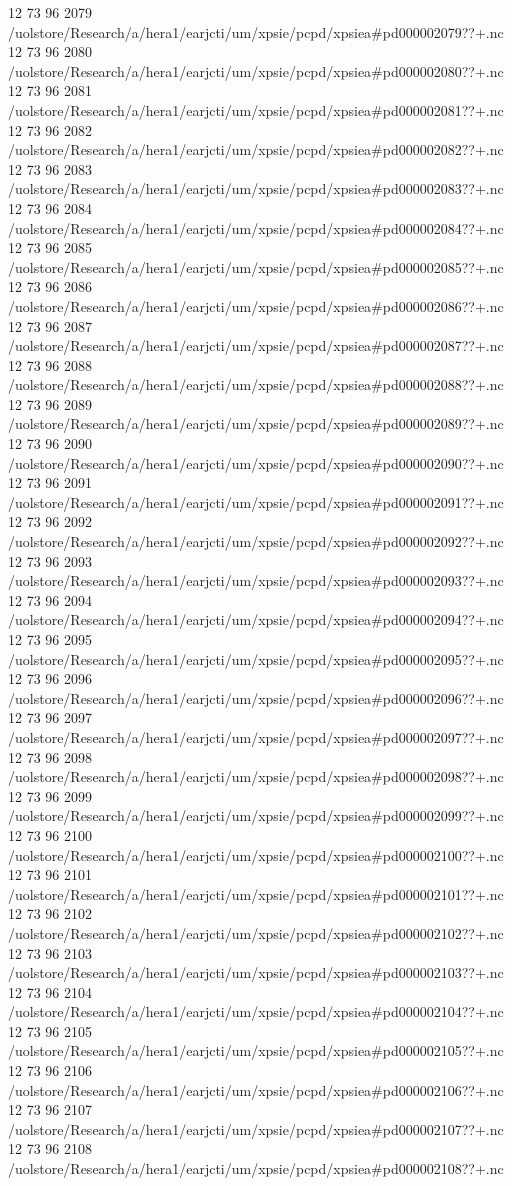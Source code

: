 12 73 96
2079
/uolstore/Research/a/hera1/earjcti/um/xpsie/pcpd/xpsiea#pd000002079??+.nc
12 73 96
2080
/uolstore/Research/a/hera1/earjcti/um/xpsie/pcpd/xpsiea#pd000002080??+.nc
12 73 96
2081
/uolstore/Research/a/hera1/earjcti/um/xpsie/pcpd/xpsiea#pd000002081??+.nc
12 73 96
2082
/uolstore/Research/a/hera1/earjcti/um/xpsie/pcpd/xpsiea#pd000002082??+.nc
12 73 96
2083
/uolstore/Research/a/hera1/earjcti/um/xpsie/pcpd/xpsiea#pd000002083??+.nc
12 73 96
2084
/uolstore/Research/a/hera1/earjcti/um/xpsie/pcpd/xpsiea#pd000002084??+.nc
12 73 96
2085
/uolstore/Research/a/hera1/earjcti/um/xpsie/pcpd/xpsiea#pd000002085??+.nc
12 73 96
2086
/uolstore/Research/a/hera1/earjcti/um/xpsie/pcpd/xpsiea#pd000002086??+.nc
12 73 96
2087
/uolstore/Research/a/hera1/earjcti/um/xpsie/pcpd/xpsiea#pd000002087??+.nc
12 73 96
2088
/uolstore/Research/a/hera1/earjcti/um/xpsie/pcpd/xpsiea#pd000002088??+.nc
12 73 96
2089
/uolstore/Research/a/hera1/earjcti/um/xpsie/pcpd/xpsiea#pd000002089??+.nc
12 73 96
2090
/uolstore/Research/a/hera1/earjcti/um/xpsie/pcpd/xpsiea#pd000002090??+.nc
12 73 96
2091
/uolstore/Research/a/hera1/earjcti/um/xpsie/pcpd/xpsiea#pd000002091??+.nc
12 73 96
2092
/uolstore/Research/a/hera1/earjcti/um/xpsie/pcpd/xpsiea#pd000002092??+.nc
12 73 96
2093
/uolstore/Research/a/hera1/earjcti/um/xpsie/pcpd/xpsiea#pd000002093??+.nc
12 73 96
2094
/uolstore/Research/a/hera1/earjcti/um/xpsie/pcpd/xpsiea#pd000002094??+.nc
12 73 96
2095
/uolstore/Research/a/hera1/earjcti/um/xpsie/pcpd/xpsiea#pd000002095??+.nc
12 73 96
2096
/uolstore/Research/a/hera1/earjcti/um/xpsie/pcpd/xpsiea#pd000002096??+.nc
12 73 96
2097
/uolstore/Research/a/hera1/earjcti/um/xpsie/pcpd/xpsiea#pd000002097??+.nc
12 73 96
2098
/uolstore/Research/a/hera1/earjcti/um/xpsie/pcpd/xpsiea#pd000002098??+.nc
12 73 96
2099
/uolstore/Research/a/hera1/earjcti/um/xpsie/pcpd/xpsiea#pd000002099??+.nc
12 73 96
2100
/uolstore/Research/a/hera1/earjcti/um/xpsie/pcpd/xpsiea#pd000002100??+.nc
12 73 96
2101
/uolstore/Research/a/hera1/earjcti/um/xpsie/pcpd/xpsiea#pd000002101??+.nc
12 73 96
2102
/uolstore/Research/a/hera1/earjcti/um/xpsie/pcpd/xpsiea#pd000002102??+.nc
12 73 96
2103
/uolstore/Research/a/hera1/earjcti/um/xpsie/pcpd/xpsiea#pd000002103??+.nc
12 73 96
2104
/uolstore/Research/a/hera1/earjcti/um/xpsie/pcpd/xpsiea#pd000002104??+.nc
12 73 96
2105
/uolstore/Research/a/hera1/earjcti/um/xpsie/pcpd/xpsiea#pd000002105??+.nc
12 73 96
2106
/uolstore/Research/a/hera1/earjcti/um/xpsie/pcpd/xpsiea#pd000002106??+.nc
12 73 96
2107
/uolstore/Research/a/hera1/earjcti/um/xpsie/pcpd/xpsiea#pd000002107??+.nc
12 73 96
2108
/uolstore/Research/a/hera1/earjcti/um/xpsie/pcpd/xpsiea#pd000002108??+.nc
